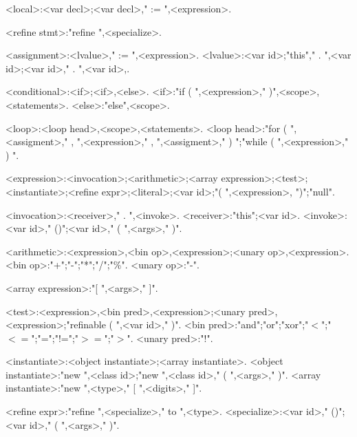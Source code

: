 \begin{grammar}
<local>:<var decl>;<var decl>," := ",<expression>.

<refine stmt>:"refine ",<specialize>.

<assignment>:<lvalue>," := ",<expression>.
<lvalue>:<var id>;"this"," . ",<var id>;<var id>," . ",<var id>,.

<conditional>:<if>;<if>,<else>.
<if>:"if ( ",<expression>," )",<scope>,<statements>.
<else>:"else",<scope>.

<loop>:<loop head>,<scope>,<statements>.
<loop head>:"for ( ",<assigment>," , ",<expression>," , ",<assigment>," ) ";"while ( ",<expression>," ) ".

<expression>:<invocation>;<arithmetic>;<array expression>;<test>;<instantiate>;<refine expr>;<literal>;<var id>;"( ",<expression>, ")";"null".

<invocation>:<receiver>," . ",<invoke>.
<receiver>:"this";<var id>.
<invoke>:<var id>," ()";<var id>," ( ",<args>," )".

<arithmetic>:<expression>,<bin op>,<expression>;<unary op>,<expression>.
<bin op>:"+";"-";"*";"/";"\%".
<unary op>:"-".

<array expression>:"[ ",<args>," ]".

<test>:<expression>,<bin pred>,<expression>;<unary pred>,<expression>;"refinable ( ",<var id>," )".
<bin pred>:"and";"or";"xor";"$<$";"$<=$";"=";"!=";"$>=$";"$>$".
<unary pred>:"!".

<instantiate>:<object instantiate>;<array instantiate>.
<object instantiate>:"new ",<class id>;"new ",<class id>," ( ",<args>," )".
<array instantiate>:"new ",<type>," [ ",<digits>," ]".

<refine expr>:"refine ",<specialize>," to ",<type>.
<specialize>:<var id>," ()";<var id>," ( ",<args>," )".


\end{grammar}
